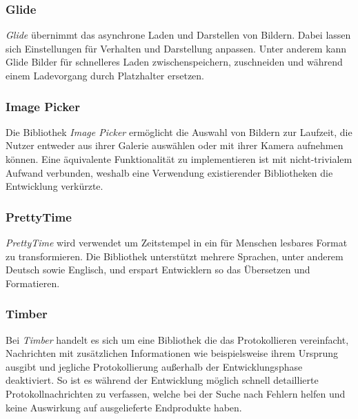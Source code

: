 \subsubsection{Glide}
\label{subsubsec:app:bibs:glide}
\textit{Glide} übernimmt das asynchrone Laden und Darstellen von Bildern.
Dabei lassen sich Einstellungen für Verhalten und Darstellung anpassen.
Unter anderem kann Glide Bilder für schnelleres Laden zwischenspeichern, zuschneiden und während einem Ladevorgang durch Platzhalter ersetzen.

\subsubsection{Image Picker}
\label{subsubsec:app:bibs:imagepicker}
Die Bibliothek \textit{Image Picker} ermöglicht die Auswahl von Bildern zur Laufzeit, die Nutzer entweder aus ihrer Galerie auswählen oder mit ihrer Kamera aufnehmen können.
Eine äquivalente Funktionalität zu implementieren ist mit nicht-trivialem Aufwand verbunden, weshalb eine Verwendung existierender Bibliotheken die Entwicklung verkürzte.

\subsubsection{PrettyTime}
\label{subsubsec:app:bibs:prettytime}
\textit{PrettyTime} wird verwendet um Zeitstempel in ein für Menschen lesbares Format zu transformieren.
Die Bibliothek unterstützt mehrere Sprachen, unter anderem Deutsch sowie Englisch, und erspart Entwicklern so das Übersetzen und Formatieren.

\subsubsection{Timber}
\label{subsubsec:app:bibs:timber}
Bei \textit{Timber} handelt es sich um eine Bibliothek die das Protokollieren vereinfacht, Nachrichten mit zusätzlichen Informationen wie beispielsweise ihrem Ursprung ausgibt und jegliche Protokollierung außerhalb der Entwicklungsphase deaktiviert.
So ist es während der Entwicklung möglich schnell detaillierte Protokollnachrichten zu verfassen, welche bei der Suche nach Fehlern helfen und keine Auswirkung auf ausgelieferte Endprodukte haben.

